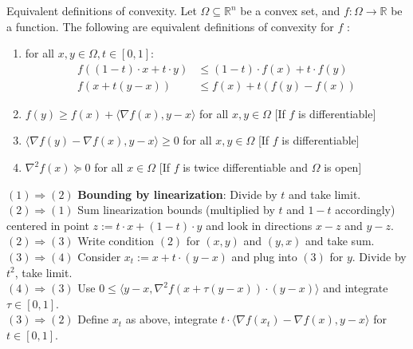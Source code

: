 \begin{theorem}[L4.3]{Equivalent definitions of convexity.}
    Let $\Omega \subseteq \mathbb{R}^n$ be a convex set, and $f: \Omega \rightarrow \mathbb{R}$ be a function. The following are equivalent definitions of convexity for $f$ :
    \begin{enumerate}[leftmargin=*]
        \item for all $x, y \in \Omega, t \in[0,1]$:
        \vspace{-4pt}\\
        $$
            \begin{aligned}
                f((1-t) \cdot x+t \cdot y) &\leq (1-t) \cdot f(x)+t \cdot f(y)\\
                f(x + t(y-x)) &\leq f(x) + t(f(y) - f(x))
            \end{aligned}
        $$
        \vspace{-4pt}
        \item $f(y) \geq f(x)+\langle\nabla f(x), y-x\rangle$ for all $x, y \in \Omega$ [If $f$ is differentiable]
        \item $\langle\nabla f(y)-\nabla f(x), y-x\rangle \geq 0$ for all $x, y \in \Omega$ [If $f$ is differentiable]
        \item $\nabla^2 f(x) \succeq 0$ for all $x \in \Omega$ [If $f$ is twice differentiable and $\Omega$ is open]
    \end{enumerate}
    $(1) \Rightarrow (2)$ \textbf{Bounding by linearization}: Divide by $t$ and take limit.\\
    $(2) \Rightarrow (1)$ Sum linearization bounds (multiplied by $t$ and $1-t$ accordingly) centered in point $z := t \cdot x + (1-t) \cdot y$ and look in directions $x-z$ and $y-z$.\\
    $(2) \Rightarrow (3)$ Write condition $(2)$ for $(x,y)$ and $(y,x)$ and take sum.\\
    $(3) \Rightarrow (4)$ Consider $x_t:=x+t \cdot (y-x)$ and plug into $(3)$ for $y$. Divide by $t^2$, take limit.\\
    $(4) \Rightarrow (3)$ Use $0\leq \langle y-x, \nabla^2 f(x + \tau (y-x))\cdot (y-x)\rangle$ and integrate $\tau\in[0,1]$.\\
    $(3) \Rightarrow (2)$ Define $x_t$ as above, integrate $t \cdot \langle \nabla f(x_t) - \nabla f(x), y-x\rangle$ for $t\in[0,1]$.
\end{theorem}

